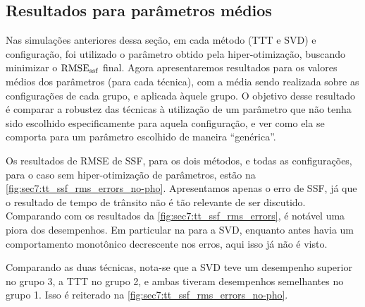 \subsection{Resultados para parâmetros médios}

Nas simulações anteriores dessa seção, em cada método (TTT e SVD) e configuração, foi utilizado o parâmetro obtido pela hiper-otimização, buscando minimizar o $\operatorname{RMSE}_{\operatorname{ssf}}$ final. Agora apresentaremos resultados para os valores médios dos parâmetros (para cada técnica), com a média sendo realizada sobre as configurações de cada grupo, e aplicada àquele grupo. O objetivo desse resultado é comparar a robustez das técnicas à utilização de um parâmetro que não tenha sido escolhido especificamente para aquela configuração, e ver como ela se comporta para um parâmetro escolhido de maneira ``genérica''.
%
\def\sympathA{meanpar-import--petro/260527-14h15m17s-a--layer}
\def\sympathB{meanpar-import--petro/260527-14h15m17s-b--layer;blob}
\def\sympathC{meanpar-import--petro/260527-14h15m17s-c--layer;layer+diag}
\def\sympathD{meanpar-import--petro/260527-14h15m17s-d--layer;layer+appendix}
\def\sympathE{meanpar-import--petro/260527-14h15m17s-e--layer;bracket}
\def\sympathF{meanpar-import--petro/260527-14h15m17s-f--layer+column;layer+column}
\def\sympathG{meanpar-import--petro/260527-14h15m17s-g--layer;cap}
\def\sympathH{meanpar-import--petro/260527-14h15m17s-h--layer+column;layer}
\def\sympathI{meanpar-import--petro/260527-14h15m17s-i--layer;layer+column}
\def\sympathJ{meanpar-import--petro/260527-14h15m17s-j--layer+vertical;layer+vertical}
\def\sympathK{meanpar-import--petro/260527-14h15m17s-k--layer+vertical;layer}
\def\sympathL{meanpar-import--petro/260527-14h15m17s-l--layer;layer+vertical}
\def\sympathM{meanpar-import--petro/260527-14h15m17s-m--layer+sparse;layer}
\def\sympathN{meanpar-import--petro/260527-14h15m17s-n--layer;layer+sparse}
\def\sympathO{meanpar-import--petro/260527-14h15m17s-o--cup;layer}

\const Os resultados de RMSE de SSF, para os dois métodos, e todas as configurações, para o caso sem hiper-otimização de parâmetros, estão na \cref{fig:sec7:tt_ssf_rms_errors_no-pho}. Apresentamos apenas o erro de SSF, já que o resultado de tempo de trânsito não é tão relevante de ser discutido. Comparando com os resultados da \cref{fig:sec7:tt_ssf_rms_errors}, é notável uma piora dos desempenhos. Em particular na para a SVD, enquanto antes havia um comportamento monotônico decrescente nos erros, aqui isso já não é visto.



\const Comparando as duas técnicas, nota-se que a SVD teve um desempenho superior no grupo 3, a TTT no grupo 2, e ambas tiveram desempenhos semelhantes no grupo 1. Isso é reiterado na \cref{fig:sec7:tt_ssf_rms_errors_no-pho}.

